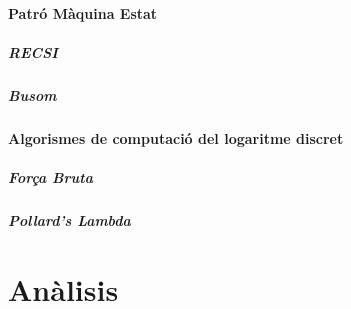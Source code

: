 \documentclass{article}
\begin{document}
\subsection{Patró Màquina Estat}
\subsubsection{RECSI}
\subsubsection{Busom}
\subsection{Algorismes de computació del logaritme discret}
\subsubsection{Força Bruta}
\subsubsection{Pollard's Lambda}
\part{Anàlisis}\label{part:analisis}



\end{document}

